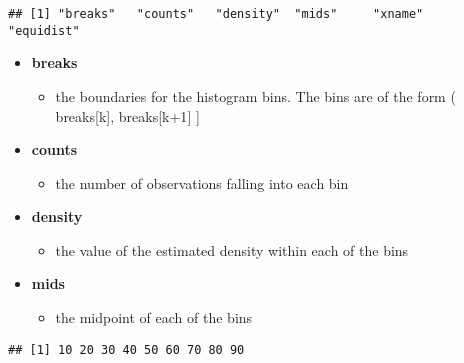 \documentclass[]{book}
\newenvironment{Shaded}{\begin{snugshade}}{\end{snugshade}}
\newcommand{\NormalTok}[1]{#1}
\newcommand{\OperatorTok}[1]{\textcolor[rgb]{0.81,0.36,0.00}{\textbf{#1}}}
\providecommand{\tightlist}{%
  \setlength{\itemsep}{0pt}\setlength{\parskip}{0pt}}
\begin{document}
\begin{verbatim}
## [1] "breaks"   "counts"   "density"  "mids"     "xname"    "equidist"
\end{verbatim}

\begin{itemize}
\tightlist
\item
  \textbf{breaks}

  \begin{itemize}
  \tightlist
  \item
    the boundaries for the histogram bins. The bins are of the form ( breaks{[}k{]}, breaks{[}k+1{]} {]}
  \end{itemize}
\item
  \textbf{counts}

  \begin{itemize}
  \tightlist
  \item
    the number of observations falling into each bin
  \end{itemize}
\item
  \textbf{density}

  \begin{itemize}
  \tightlist
  \item
    the value of the estimated density within each of the bins
  \end{itemize}
\item
  \textbf{mids}

  \begin{itemize}
  \tightlist
  \item
    the midpoint of each of the bins
  \end{itemize}
\end{itemize}

\begin{Shaded}
\end{Shaded}

\begin{verbatim}
## [1] 10 20 30 40 50 60 70 80 90
\end{verbatim}

\begin{Shaded}
\end{Shaded}
\end{document}
